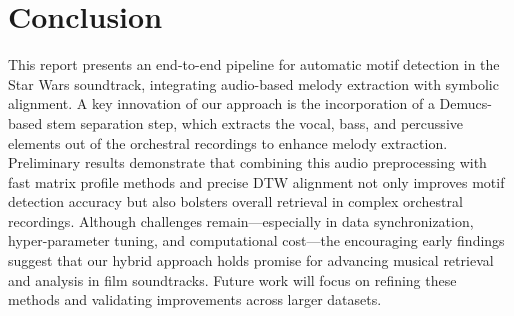 \documentclass[conference]{IEEEtran}
\begin{document}
\section{Conclusion}
This report presents an end-to-end pipeline for automatic motif detection in the Star Wars soundtrack, integrating audio-based melody extraction with symbolic alignment. A key innovation of our approach is the incorporation of a Demucs-based stem separation step, which extracts the vocal, bass, and percussive elements out of the orchestral recordings to enhance melody extraction. Preliminary results demonstrate that combining this audio preprocessing with fast matrix profile methods and precise DTW alignment not only improves motif detection accuracy but also bolsters overall retrieval in complex orchestral recordings. Although challenges remain—especially in data synchronization, hyper-parameter tuning, and computational cost—the encouraging early findings suggest that our hybrid approach holds promise for advancing musical retrieval and analysis in film soundtracks. Future work will focus on refining these methods and validating improvements across larger datasets.
\end{document}
